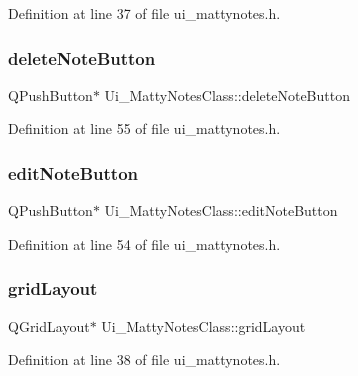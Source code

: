 Definition at line 37 of file ui\+\_\+mattynotes.\+h.

\hypertarget{classUi__MattyNotesClass_ad921ff558d332e85a8b8ca56953ced43}{}\label{classUi__MattyNotesClass_ad921ff558d332e85a8b8ca56953ced43} 
\subsubsection{\texorpdfstring{delete\+Note\+Button}{deleteNoteButton}}
{\footnotesize\ttfamily Q\+Push\+Button$\ast$ Ui\+\_\+\+Matty\+Notes\+Class\+::delete\+Note\+Button}



Definition at line 55 of file ui\+\_\+mattynotes.\+h.

\hypertarget{classUi__MattyNotesClass_ab58c2780261a9be6d5ee1baae1743c4a}{}\label{classUi__MattyNotesClass_ab58c2780261a9be6d5ee1baae1743c4a} 
\subsubsection{\texorpdfstring{edit\+Note\+Button}{editNoteButton}}
{\footnotesize\ttfamily Q\+Push\+Button$\ast$ Ui\+\_\+\+Matty\+Notes\+Class\+::edit\+Note\+Button}



Definition at line 54 of file ui\+\_\+mattynotes.\+h.

\hypertarget{classUi__MattyNotesClass_a854a660e1e7abdbd4548aa4b39969196}{}\label{classUi__MattyNotesClass_a854a660e1e7abdbd4548aa4b39969196} 
\subsubsection{\texorpdfstring{grid\+Layout}{gridLayout}}
{\footnotesize\ttfamily Q\+Grid\+Layout$\ast$ Ui\+\_\+\+Matty\+Notes\+Class\+::grid\+Layout}



Definition at line 38 of file ui\+\_\+mattynotes.\+h.

